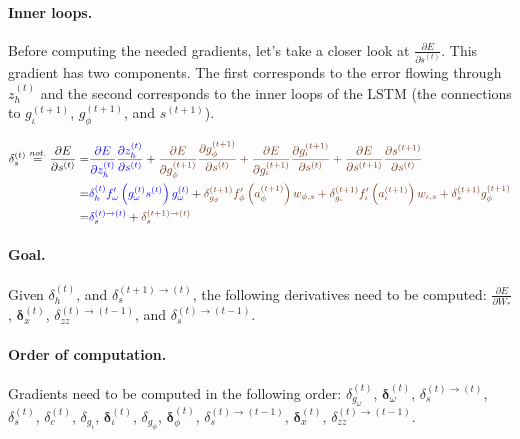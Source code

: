 \documentclass[11pt]{article}
\begin{document}
\paragraph{Inner loops.} Before computing the needed gradients, let's take a closer look at $\frac{\partial E}{\partial s^{(t)}}$. This gradient has two components. The first corresponds to the error flowing through $z_h^{(t)}$ and the second corresponds to the inner loops of the LSTM (the connections to $g_{\iota}^{(t+1)}$, $g_{\phi}^{(t+1)}$, and $s^{(t+1)}$).

\begin{equation}
\begin{split}
    \delta_{s}^{(t)} \overset{not.}{=} \displaystyle\frac{\partial E}{\partial s^{(t)}} = &
    {\color{blue} \displaystyle\frac{\partial E}{\partial z_h^{(t)}}
    \displaystyle\frac{\partial z_h^{(t)}}{\partial s^{(t)}}} +
    {\color{auburn}\displaystyle\frac{\partial E}{\partial g_{\phi}^{(t+1)}}
    \displaystyle\frac{\partial g_{\phi}^{(t+1)}}{\partial s^{(t)}} +
    \displaystyle\frac{\partial E}{\partial g_{\iota}^{(t+1)}}
    \displaystyle\frac{\partial g_{\iota}^{(t+1)}}{\partial s^{(t)}} +
    \displaystyle\frac{\partial E}{\partial s^{(t+1)}}
    \displaystyle\frac{\partial s^{(t+1)}}{\partial s^{(t)}}} \\
    = & {\color{blue} \delta_{h}^{(t)} f_{\omega}'\left(g_{\omega}^{(t)}s^{(t)}\right) g_{\omega}^{(t)}} +
        {\color{auburn}\delta_{g_{\phi}}^{(t+1)}f_{\phi}'\left(a_{\phi}^{(t+1)}\right)w_{\phi, s} +
        \delta_{g_{\iota}}^{(t+1)}f_{\iota}'\left(a_{\iota}^{(t+1)}\right)w_{\iota, s} +
        \delta_{s}^{(t+1)}g_{\phi}^{(t+1)}} \\
    = & {\color{blue}\delta^{(t) \rightarrow (t)}_s} +
        {\color{auburn}\delta^{(t+1) \rightarrow (t)}_s}
\end{split}
\end{equation}

\paragraph{Goal.} Given $\delta_h^{(t)}$, and $\delta^{(t+1) \rightarrow (t)}_s$, the following derivatives need to be computed: $\displaystyle \frac{\partial E}{\partial W_{*}}$, $\boldsymbol{\delta}_x^{(t)}$, $\delta_{zz}^{(t)\rightarrow(t-1)}$, and $\delta^{(t) \rightarrow (t-1)}_s$.

\paragraph{Order of computation.}
Gradients need to be computed in the following order: $\delta_{g_{\omega}}^{(t)}$, $\boldsymbol{\delta}_{\omega}^{(t)}$, $\delta_s^{(t) \rightarrow (t)}$, $\delta_s^{(t)}$, $\delta_c^{(t)}$, $\delta_{g_{\iota}}$, $\boldsymbol{\delta}_{\iota}^{(t)}$, $\delta_{g_{\phi}}$, $\boldsymbol{\delta}_{\phi}^{(t)}$,
$\delta_s^{(t) \rightarrow (t-1)}$, $\boldsymbol{\delta}_x^{(t)}$, $\delta_{zz}^{(t)\rightarrow(t-1)}$.
\end{document}
